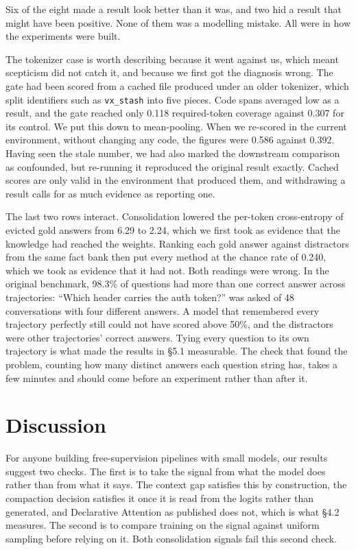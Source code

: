 \documentclass[10pt]{article}
\begin{document}
Six of the eight made a result look better than it was, and two hid a result that might have
been positive. None of them was a modelling mistake. All were in how the experiments were
built.

The tokenizer case is worth describing because it went against us, which meant scepticism
did not catch it, and because we first got the diagnosis wrong. The gate had been scored from
a cached file produced under an older tokenizer, which split identifiers such as \texttt{vx\_stash}
into five pieces. Code spans averaged low as a result, and the gate reached only 0.118
required-token coverage against 0.307 for its control. We put this down to mean-pooling.
When we re-scored in the current environment, without changing any code, the figures were
0.586 against 0.392. Having seen the stale number, we had also marked the downstream
comparison as confounded, but re-running it reproduced the original result exactly. Cached
scores are only valid in the environment that produced them, and withdrawing a result calls
for as much evidence as reporting one.

The last two rows interact. Consolidation lowered the per-token cross-entropy of evicted
gold answers from 6.29 to 2.24, which we first took as evidence that the knowledge had
reached the weights. Ranking each gold answer against distractors from the same fact bank
then put every method at the chance rate of 0.240, which we took as evidence that it had
not. Both readings were wrong. In the original benchmark, 98.3\% of questions had more than
one correct answer across trajectories: ``Which header carries the auth token?'' was asked of
48 conversations with four different answers. A model that remembered every trajectory
perfectly still could not have scored above 50\%, and the distractors were other
trajectories' correct answers. Tying every question to its own trajectory is what made the
results in §5.1 measurable. The check that found the problem, counting how many distinct
answers each question string has, takes a few minutes and should come before an experiment
rather than after it.

\section{Discussion}

For anyone building free-supervision pipelines with small models, our results suggest two
checks. The first is to take the signal from what the model does rather than from what it
says. The context gap satisfies this by construction, the compaction decision satisfies it
once it is read from the logits rather than generated, and Declarative Attention as published
does not, which is what §4.2 measures. The second is to compare training on the signal
against uniform sampling before relying on it. Both consolidation signals fail this second
check.
\end{document}
